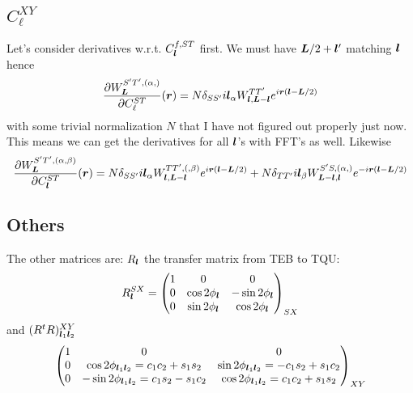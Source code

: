 \documentclass[11pt]{article}
\begin{document}
\subsection{$C_\ell^{XY}$}
Let's consider derivatives w.r.t. $C^{f, ST}_{\boldsymbol{l}}$ first.  We must have $\boldsymbol{L}/2 + \boldsymbol{l}'$ matching $\boldsymbol{l}$ hence
\begin{equation}
	\frac{\partial W_{\boldsymbol{L}}^{S'T', (\alpha,)}}{\partial C_\ell^{ST}}(\boldsymbol{r}) = N\delta_{SS'}i\boldsymbol{l}_\alpha W^{TT'}_{\boldsymbol{l}, \boldsymbol{L}-\boldsymbol{l}}e^{i \boldsymbol{r} \left(\boldsymbol{l} - \boldsymbol{L}/2 \right)}
\end{equation}
with some trivial normalization $N$ that I have not figured out properly just now. This means we can get the derivatives for all $\boldsymbol{l}$'s with FFT's as well. Likewise
\begin{equation}
		\frac{\partial W_{\boldsymbol{L}}^{S'T', (\alpha, \beta)}}{\partial C_{\boldsymbol{l}}^{ST}}(\boldsymbol{r}) = N\delta_{SS'}i\boldsymbol{l}_\alpha W^{TT', (,\beta)}_{\boldsymbol{l}, \boldsymbol{L}-\boldsymbol{l}}e^{i \boldsymbol{r} \left(\boldsymbol{l} - \boldsymbol{L}/2 \right)} + N \delta_{TT'} i\boldsymbol{l}_\beta W^{S'S, (\alpha,)}_{\boldsymbol{L}-\boldsymbol{l}, \boldsymbol{l}} e^{-i\boldsymbol{r}(\boldsymbol{l} -\boldsymbol{L}/2)}
\end{equation}
\subsection{Others}
The other matrices are: $R_{\boldsymbol{l}}$ the transfer matrix from TEB to TQU:
\begin{equation} R^{SX}_{\boldsymbol{l}} = 
	\begin{pmatrix}
		1 & 0 & 0 \\ 0 & \cos 2\phi_{\boldsymbol{l}} & -\sin 2\phi_{\boldsymbol{l}} \\ 0 & \sin 2\phi_{\boldsymbol{l}} & \cos 2\phi_{\boldsymbol{l}}
	\end{pmatrix}_{SX}
\end{equation}
and $(R^tR)^{XY}_{\boldsymbol{l}_1\boldsymbol{l}_2}$
\begin{equation}
		\begin{pmatrix}
		1 & 0 & 0 \\ 0 & \cos 2\phi_{\boldsymbol{l}_1\boldsymbol{l}_2}= c_1c_2 + s_1 s_2 & \sin 2\phi_{\boldsymbol{l}_1\boldsymbol{l}_2}= -c_1s_2 + s_1 c_2 \\ 0 & -\sin 2\phi_{\boldsymbol{l}_1\boldsymbol{l}_2}= c_1s_2 - s_1 c_2 & \cos 2\phi_{\boldsymbol{l}_1\boldsymbol{l}_2}= c_1c_2 + s_1 s_2
	\end{pmatrix}_{XY}
\end{equation}
\end{document}
